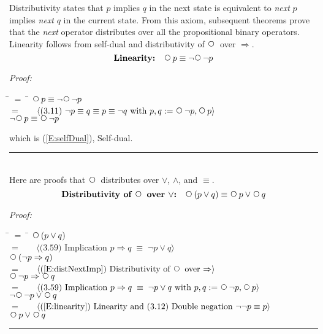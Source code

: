 \documentclass[fleqn, leqno]{article}
\newcommand{\lgap}{2pt}                             %
\newcommand{\mymathindent}{24pt}                    %
\newcommand{\equivs}{\ensuremath{\;\equiv\;}}       %
\newcommand{\impl}{\ensuremath{\Rightarrow}}        %
\newcommand{\Next}{\;\,\text{\raisebox{3.5pt}{\circle{6}}}}
\newcommand{\myqed}{\hfill\rule[-.23ex]{1.2ex}{2.0ex}}
\newcommand{\Gll} {\langle}                         %
\newcommand{\Ggg} {\rangle}                         %
\newcommand{\Hint}[1]     {\ \ \ $\Gll              \mbox{#1} \Ggg$ }   %
\begin{document}
Distributivity states that $p$ implies $q$ in the next state is equivalent to \textit{next} $p$ implies \textit{next} $q$ in the current state.
From this axiom, subsequent theorems prove that the \textit{next} operator distributes over all the propositional binary operators.\\

Linearity follows from self-dual and distributivity of $\Next$ over $\impl$.
\begin{equation}\label{E:linearity}
\textbf{Linearity:}\quad \Next p \equiv \neg\Next\neg p
\end{equation}

\emph{Proof:}
\begin{tabbing}
\hspace{\mymathindent} \= $= \;$ \= \kill
  \> \>   $\Next p \equiv \neg\Next\neg p$\\[\lgap]
  \> $=$  \>  \Hint{(3.11) $\neg p \equiv q \equiv p \equiv \neg q$ with $p,q := \Next\neg p, \Next p$} \\[\lgap]
  \> \>   $\neg\Next p \equiv \Next\neg p$
\end{tabbing}
which is (\ref{E:selfDual}), Self-dual. \myqed\\[\lgap]

Here are proofs that $\Next$ distributes over $\lor$, $\land$, and $\equiv$.
\begin{equation}\label{E:distNextOr}
\textbf{Distributivity of $\Next$ over $\lor$:}\quad \Next (p \lor q) \equiv \Next p \lor \Next q
\end{equation}

\emph{Proof:}
\begin{tabbing}
\hspace{\mymathindent} \= $= \;$ \= \kill
	\> \>   $\Next(p \lor q)$\\[\lgap]
	\> $=$  \>  \Hint{(3.59) Implication $p\impl q \equivs \neg p \lor q$}\\[\lgap]
	\> \>   $\Next(\neg p \impl q)$\\[\lgap]
	\> $=$  \>  \Hint{(\ref{E:distNextImp}) Distributivity of $\Next$ over $\impl$}\\[\lgap]
	\> \>   $\Next\neg p \impl \Next q$\\[\lgap]
	\> $=$  \>  \Hint{(3.59) Implication $p\impl q \equivs \neg p \lor q$ with $p,q := \Next\neg p, \Next p$}\\[\lgap]
	\> \>   $\neg\Next\neg p \lor \Next q$\\[\lgap]
	\> $=$  \>  \Hint{(\ref{E:linearity}) Linearity and (3.12) Double negation $\neg\neg p\equiv p$}\\[\lgap]
	\> \>   $\Next p \lor \Next q$
\end{tabbing}
\myqed\\[\lgap]
\end{document}
